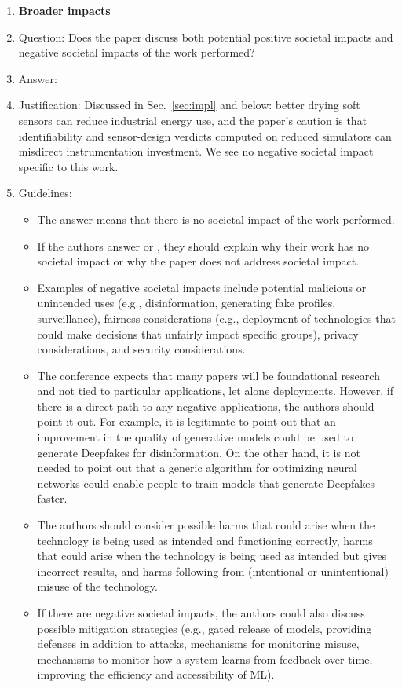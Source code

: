 \begin{enumerate}
\item {\bf Broader impacts}
    \item[] Question: Does the paper discuss both potential positive societal impacts and negative societal impacts of the work performed?
    \item[] Answer: \answerYes{} %
    \item[] Justification: Discussed in Sec.~\ref{sec:impl} and below: better drying soft sensors can reduce industrial energy use, and the paper's caution is that identifiability and sensor-design verdicts computed on reduced simulators can misdirect instrumentation investment. We see no negative societal impact specific to this work.
    \item[] Guidelines:
    \begin{itemize}
        \item The answer \answerNA{} means that there is no societal impact of the work performed.
        \item If the authors answer \answerNA{} or \answerNo, they should explain why their work has no societal impact or why the paper does not address societal impact.
        \item Examples of negative societal impacts include potential malicious or unintended uses (e.g., disinformation, generating fake profiles, surveillance), fairness considerations (e.g., deployment of technologies that could make decisions that unfairly impact specific groups), privacy considerations, and security considerations.
        \item The conference expects that many papers will be foundational research and not tied to particular applications, let alone deployments. However, if there is a direct path to any negative applications, the authors should point it out. For example, it is legitimate to point out that an improvement in the quality of generative models could be used to generate Deepfakes for disinformation. On the other hand, it is not needed to point out that a generic algorithm for optimizing neural networks could enable people to train models that generate Deepfakes faster.
        \item The authors should consider possible harms that could arise when the technology is being used as intended and functioning correctly, harms that could arise when the technology is being used as intended but gives incorrect results, and harms following from (intentional or unintentional) misuse of the technology.
        \item If there are negative societal impacts, the authors could also discuss possible mitigation strategies (e.g., gated release of models, providing defenses in addition to attacks, mechanisms for monitoring misuse, mechanisms to monitor how a system learns from feedback over time, improving the efficiency and accessibility of ML).
    \end{itemize}
    

\end{enumerate}
